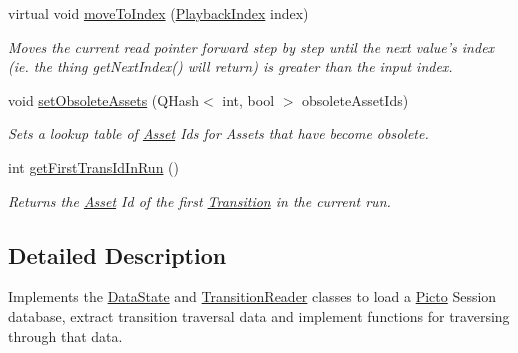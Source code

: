 \begin{DoxyCompactItemize}
virtual void \hyperlink{class_picto_1_1_transition_state_a9a21bdd8867aa905059d4495664735a7}{move\-To\-Index} (\hyperlink{struct_picto_1_1_playback_index}{Playback\-Index} index)
\begin{DoxyCompactList}\small\item\em Moves the current read pointer forward step by step until the next value's index (ie. the thing get\-Next\-Index() will return) is greater than the input index. \end{DoxyCompactList}\item 
void \hyperlink{class_picto_1_1_transition_state_a39aeeed3109b3a9882a24c9ff660e208}{set\-Obsolete\-Assets} (Q\-Hash$<$ int, bool $>$ obsolete\-Asset\-Ids)
\begin{DoxyCompactList}\small\item\em Sets a lookup table of \hyperlink{class_picto_1_1_asset}{Asset} Ids for Assets that have become obsolete. \end{DoxyCompactList}\item 
\hypertarget{class_picto_1_1_transition_state_a5bfa66cb7103c0b3bcda6de0613fb34f}{int \hyperlink{class_picto_1_1_transition_state_a5bfa66cb7103c0b3bcda6de0613fb34f}{get\-First\-Trans\-Id\-In\-Run} ()}\label{class_picto_1_1_transition_state_a5bfa66cb7103c0b3bcda6de0613fb34f}

\begin{DoxyCompactList}\small\item\em Returns the \hyperlink{class_picto_1_1_asset}{Asset} Id of the first \hyperlink{class_picto_1_1_transition}{Transition} in the current run. \end{DoxyCompactList}\end{DoxyCompactItemize}


\subsection{Detailed Description}
Implements the \hyperlink{class_picto_1_1_data_state}{Data\-State} and \hyperlink{class_picto_1_1_transition_reader}{Transition\-Reader} classes to load a \hyperlink{namespace_picto}{Picto} Session database, extract transition traversal data and implement functions for traversing through that data. 

